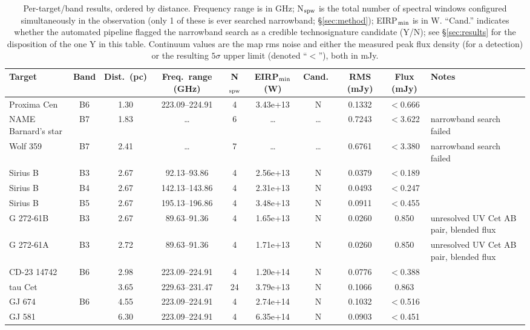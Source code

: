 \documentclass{openjournal}
\begin{document}
\begin{table}
\centering
\scriptsize
\caption{Per-target/band results, ordered by distance. Frequency range is
in GHz; N$_{\rm spw}$ is the total number of spectral windows configured
simultaneously in the observation (only 1 of these is ever searched
narrowband; \S\ref{sec:method}); EIRP$_{\rm min}$ is in W. ``Cand.''
indicates whether the automated pipeline flagged the narrowband search as
a credible technosignature candidate (Y/N); see \S\ref{sec:results} for
the disposition of the one Y in this table. Continuum values are the map
rms noise and either the measured peak flux density (for a detection) or
the resulting $5\sigma$ upper limit (denoted ``$<$''), both in mJy.}
\label{tab:full}
\begin{tabularx}{\textwidth}{@{}l c c c c c c c c X@{}}
\hline
Target & Band & Dist.\ (pc) & Freq.\ range (GHz) & N$_{\rm spw}$ & EIRP$_{\rm min}$ (W) & Cand.\ & RMS (mJy) & Flux (mJy) & Notes \\
\hline
Proxima Cen & B6 & 1.30 & 223.09--224.91 & 4 & 3.43e+13 & N & 0.1332 & $<$0.666 &  \\
NAME Barnard's star & B7 & 1.83 & \ldots & 6 & \ldots & \ldots & 0.7243 & $<$3.622 & narrowband search failed \\
Wolf  359 & B7 & 2.41 & \ldots & 7 & \ldots & \ldots & 0.6761 & $<$3.380 & narrowband search failed \\
Sirius B & B3 & 2.67 & 92.13--93.86 & 4 & 2.56e+13 & N & 0.0379 & $<$0.189 &  \\
Sirius B & B4 & 2.67 & 142.13--143.86 & 4 & 2.31e+13 & N & 0.0493 & $<$0.247 &  \\
Sirius B & B5 & 2.67 & 195.13--196.86 & 4 & 3.48e+13 & N & 0.0911 & $<$0.455 &  \\
G 272-61B & B3 & 2.67 & 89.63--91.36 & 4 & 1.65e+13 & N & 0.0260 & 0.850 & unresolved UV Cet AB pair, blended flux \\
G 272-61A & B3 & 2.72 & 89.63--91.36 & 4 & 1.71e+13 & N & 0.0260 & 0.850 & unresolved UV Cet AB pair, blended flux \\
CD-23 14742 & B6 & 2.98 & 223.09--224.91 & 4 & 1.20e+14 & N & 0.0776 & $<$0.388 &  \\
tau Cet &  & 3.65 & 229.63--231.47 & 24 & 3.79e+13 & N & 0.1066 & 0.863 &  \\
GJ 674 & B6 & 4.55 & 223.09--224.91 & 4 & 2.74e+14 & N & 0.1032 & $<$0.516 &  \\
GJ 581 &  & 6.30 & 223.09--224.91 & 4 & 6.35e+14 & N & 0.0903 & $<$0.451 &  \\

\end{tabularx}
\end{table}
\end{document}

